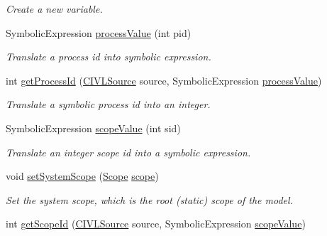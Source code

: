 \begin{DoxyCompactItemize}
\begin{DoxyCompactList}\small\item\em Create a new variable. \end{DoxyCompactList}\item 
Symbolic\+Expression \hyperlink{classedu_1_1udel_1_1cis_1_1vsl_1_1civl_1_1model_1_1common_1_1CommonModelFactory_a195ec3ddccad69197fdecc9d92c8b530}{process\+Value} (int pid)
\begin{DoxyCompactList}\small\item\em Translate a process id into symbolic expression. \end{DoxyCompactList}\item 
int \hyperlink{classedu_1_1udel_1_1cis_1_1vsl_1_1civl_1_1model_1_1common_1_1CommonModelFactory_acdc34cc925f4c0b1209bcc561be91b24}{get\+Process\+Id} (\hyperlink{interfaceedu_1_1udel_1_1cis_1_1vsl_1_1civl_1_1model_1_1IF_1_1CIVLSource}{C\+I\+V\+L\+Source} source, Symbolic\+Expression \hyperlink{classedu_1_1udel_1_1cis_1_1vsl_1_1civl_1_1model_1_1common_1_1CommonModelFactory_a195ec3ddccad69197fdecc9d92c8b530}{process\+Value})
\begin{DoxyCompactList}\small\item\em Translate a symbolic process id into an integer. \end{DoxyCompactList}\item 
Symbolic\+Expression \hyperlink{classedu_1_1udel_1_1cis_1_1vsl_1_1civl_1_1model_1_1common_1_1CommonModelFactory_afd08062d9f44b28a31c56ff8336fe52f}{scope\+Value} (int sid)
\begin{DoxyCompactList}\small\item\em Translate an integer scope id into a symbolic expression. \end{DoxyCompactList}\item 
void \hyperlink{classedu_1_1udel_1_1cis_1_1vsl_1_1civl_1_1model_1_1common_1_1CommonModelFactory_a7353b0f46f0329829ed420a67e791d3c}{set\+System\+Scope} (\hyperlink{interfaceedu_1_1udel_1_1cis_1_1vsl_1_1civl_1_1model_1_1IF_1_1Scope}{Scope} \hyperlink{classedu_1_1udel_1_1cis_1_1vsl_1_1civl_1_1model_1_1common_1_1CommonModelFactory_ace176067c807333f8832ee6b7ffcddfa}{scope})
\begin{DoxyCompactList}\small\item\em Set the system scope, which is the root (static) scope of the model. \end{DoxyCompactList}\item 
int \hyperlink{classedu_1_1udel_1_1cis_1_1vsl_1_1civl_1_1model_1_1common_1_1CommonModelFactory_a0aae9185c7285b83aeb3932a003b6f4b}{get\+Scope\+Id} (\hyperlink{interfaceedu_1_1udel_1_1cis_1_1vsl_1_1civl_1_1model_1_1IF_1_1CIVLSource}{C\+I\+V\+L\+Source} source, Symbolic\+Expression \hyperlink{classedu_1_1udel_1_1cis_1_1vsl_1_1civl_1_1model_1_1common_1_1CommonModelFactory_afd08062d9f44b28a31c56ff8336fe52f}{scope\+Value})

\end{DoxyCompactItemize}
